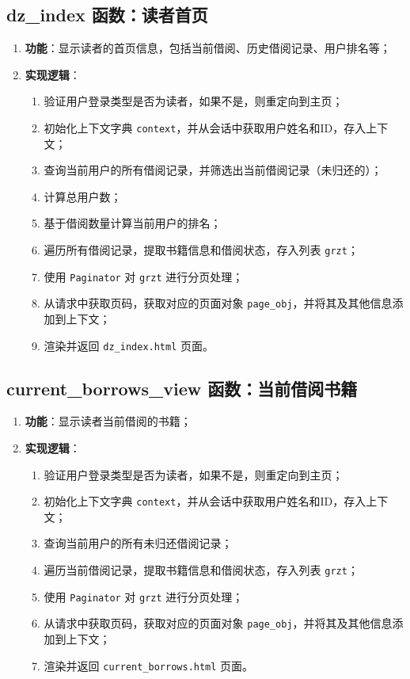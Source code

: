 \documentclass{ctexart}
\begin{document}
\subsection{dz\_index 函数：读者首页}
\begin{enumerate}
    \item \textbf{功能}：显示读者的首页信息，包括当前借阅、历史借阅记录、用户排名等；
    \item \textbf{实现逻辑}：
    \begin{enumerate}
        \item 验证用户登录类型是否为读者，如果不是，则重定向到主页；
        \item 初始化上下文字典 \texttt{context}，并从会话中获取用户姓名和ID，存入上下文；
        \item 查询当前用户的所有借阅记录，并筛选出当前借阅记录（未归还的）；
        \item 计算总用户数；
        \item 基于借阅数量计算当前用户的排名；
        \item 遍历所有借阅记录，提取书籍信息和借阅状态，存入列表 \texttt{grzt}；
        \item 使用 \texttt{Paginator} 对 \texttt{grzt} 进行分页处理；
        \item 从请求中获取页码，获取对应的页面对象 \texttt{page\_obj}，并将其及其他信息添加到上下文；
        \item 渲染并返回 \texttt{dz\_index.html} 页面。
    \end{enumerate}
\end{enumerate}

\subsection{current\_borrows\_view 函数：当前借阅书籍}
\begin{enumerate}
    \item \textbf{功能}：显示读者当前借阅的书籍；
    \item \textbf{实现逻辑}：
    \begin{enumerate}
        \item 验证用户登录类型是否为读者，如果不是，则重定向到主页；
        \item 初始化上下文字典 \texttt{context}，并从会话中获取用户姓名和ID，存入上下文；
        \item 查询当前用户的所有未归还借阅记录；
        \item 遍历当前借阅记录，提取书籍信息和借阅状态，存入列表 \texttt{grzt}；
        \item 使用 \texttt{Paginator} 对 \texttt{grzt} 进行分页处理；
        \item 从请求中获取页码，获取对应的页面对象 \texttt{page\_obj}，并将其及其他信息添加到上下文；
        \item 渲染并返回 \texttt{current\_borrows.html} 页面。
    \end{enumerate}
\end{enumerate}
\end{document}

